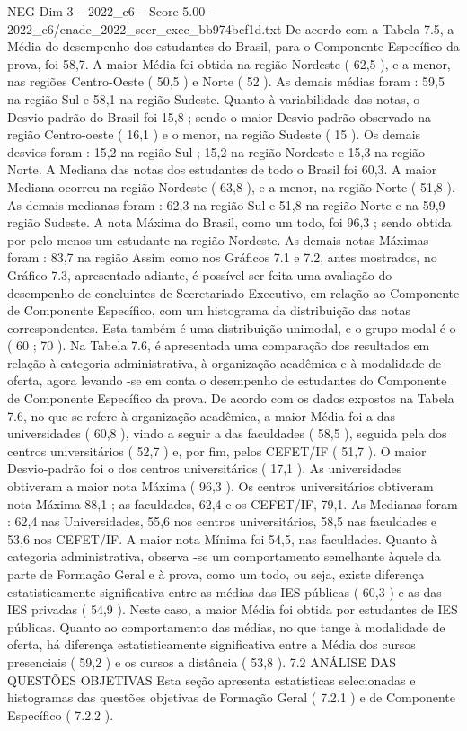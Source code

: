 \begin{textsample}{NEG Dim 3 – 2022\_c6 – Score 5.00 – 2022\_c6/enade\_2022\_secr\_exec\_bb974bcf1d.txt}
De acordo com a Tabela 7.5, a Média do desempenho dos estudantes do Brasil, para o Componente Específico da prova, foi 58,7.
A maior Média foi obtida na região Nordeste ( 62,5 ), e a menor, nas regiões Centro-Oeste ( 50,5 ) e Norte ( 52 ).
As demais médias foram : 59,5 na região Sul e 58,1 na região Sudeste.
Quanto à variabilidade das notas, o Desvio-padrão do Brasil foi 15,8 ; sendo o maior Desvio-padrão observado na região Centro-oeste ( 16,1 ) e o menor, na região Sudeste ( 15 ).
Os demais desvios foram : 15,2 na região Sul ; 15,2 na região Nordeste e 15,3 na região Norte.
A Mediana das notas dos estudantes de todo o Brasil foi 60,3.
A maior Mediana ocorreu na região Nordeste ( 63,8 ), e a menor, na região Norte ( 51,8 ).
As demais medianas foram : 62,3 na região Sul e 51,8 na região Norte e na 59,9 região Sudeste.
A nota Máxima do Brasil, como um todo, foi 96,3 ; sendo obtida por pelo menos um estudante na região Nordeste.
As demais notas Máximas foram : 83,7 na região Assim como nos Gráficos 7.1 e 7.2, antes mostrados, no Gráfico 7.3, apresentado adiante, é possível ser feita uma avaliação do desempenho de concluintes de Secretariado Executivo, em relação ao Componente de Componente Específico, com um histograma da distribuição das notas correspondentes.
Esta também é uma distribuição unimodal, e o grupo modal é o ( 60 ; 70 ).
Na Tabela 7.6, é apresentada uma comparação dos resultados em relação à categoria administrativa, à organização acadêmica e à modalidade de oferta, agora levando -se em conta o desempenho de estudantes do Componente de Componente Específico da prova.
De acordo com os dados expostos na Tabela 7.6, no que se refere à organização acadêmica, a maior Média foi a das universidades ( 60,8 ), vindo a seguir a das faculdades ( 58,5 ), seguida pela dos centros universitários ( 52,7 ) e, por fim, pelos CEFET/IF ( 51,7 ).
O maior Desvio-padrão foi o dos centros universitários ( 17,1 ).
As universidades obtiveram a maior nota Máxima ( 96,3 ).
Os centros universitários obtiveram nota Máxima 88,1 ; as faculdades, 62,4 e os CEFET/IF, 79,1.
As Medianas foram : 62,4 nas Universidades, 55,6 nos centros universitários, 58,5 nas faculdades e 53,6 nos CEFET/IF.
A maior nota Mínima foi 54,5, nas faculdades.
Quanto à categoria administrativa, observa -se um comportamento semelhante àquele da parte de Formação Geral e à prova, como um todo, ou seja, existe diferença estatisticamente significativa entre as médias das IES públicas ( 60,3 ) e as das IES privadas ( 54,9 ).
Neste caso, a maior Média foi obtida por estudantes de IES públicas.
Quanto ao comportamento das médias, no que tange à modalidade de oferta, há diferença estatisticamente significativa entre a Média dos cursos presenciais ( 59,2 ) e os cursos a distância ( 53,8 ). 7.2 ANÁLISE DAS QUESTÕES OBJETIVAS Esta seção apresenta estatísticas selecionadas e histogramas das questões objetivas de Formação Geral ( 7.2.1 ) e de Componente Específico ( 7.2.2 ).

\end{textsample}
